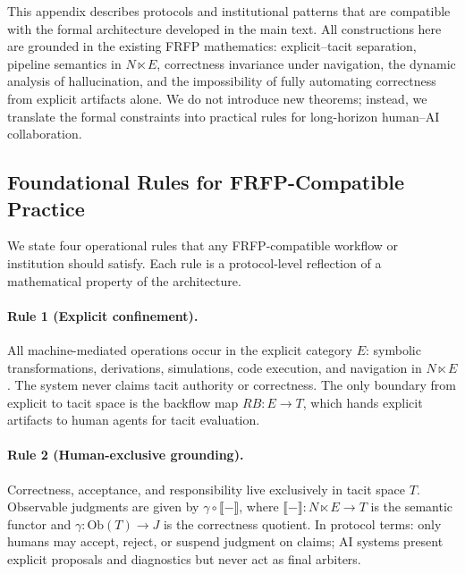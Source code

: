 This appendix describes protocols and institutional patterns that are compatible with the
formal architecture developed in the main text. All constructions here are grounded in
the existing FRFP mathematics: explicit--tacit separation, pipeline semantics in
\(N \ltimes E\), correctness invariance under navigation, the dynamic analysis of
hallucination, and the impossibility of fully automating correctness from explicit
artifacts alone. We do not introduce new theorems; instead, we translate the formal
constraints into practical rules for long-horizon human--AI collaboration.

\subsection{Foundational Rules for FRFP-Compatible Practice}

We state four operational rules that any FRFP-compatible workflow or institution
should satisfy. Each rule is a protocol-level reflection of a mathematical property
of the architecture.

\paragraph{Rule 1 (Explicit confinement).}
All machine-mediated operations occur in the explicit category \(E\): symbolic
transformations, derivations, simulations, code execution, and navigation in
\(N \ltimes E\). The system never claims tacit authority or correctness. The only
boundary from explicit to tacit space is the backflow map \(RB : E \to T\), which
hands explicit artifacts to human agents for tacit evaluation.

\paragraph{Rule 2 (Human-exclusive grounding).}
Correctness, acceptance, and responsibility live exclusively in tacit space \(T\).
Observable judgments are given by \(\gamma \circ \llbracket - \rrbracket\), where
\(\llbracket - \rrbracket : N \ltimes E \to T\) is the semantic functor and
\(\gamma : \mathrm{Ob}(T) \to J\) is the correctness quotient. In protocol terms:
only humans may accept, reject, or suspend judgment on claims; AI systems present
explicit proposals and diagnostics but never act as final arbiters.

